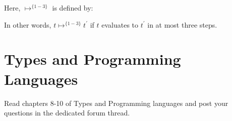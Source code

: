 Here, \(\mapsto^{\{1-3\}}\) is defined by:\\
\begin{minipage}{\textwidth}
  \vspace{1em}
  \begin{minipage}{0.2\textwidth}
    \begin{prooftree}
    \end{prooftree}
  \end{minipage}
  \hfill
  \begin{minipage}{0.3\textwidth}
    \begin{prooftree}
    \end{prooftree}
  \end{minipage}
  \hfill
  \begin{minipage}{0.45\textwidth}
    \begin{prooftree}
    \end{prooftree}
  \end{minipage}
  \hfill
  \vspace{1em}
\end{minipage}
In other words, $t\mapsto^{\{1-3\}} t^{\prime}$ if $t$ evaluates to $t^{\prime}$ in at most three steps.

\section{Types and Programming Languages}
Read chapters 8-10 of Types and Programming languages and post your questions in the dedicated forum thread.
